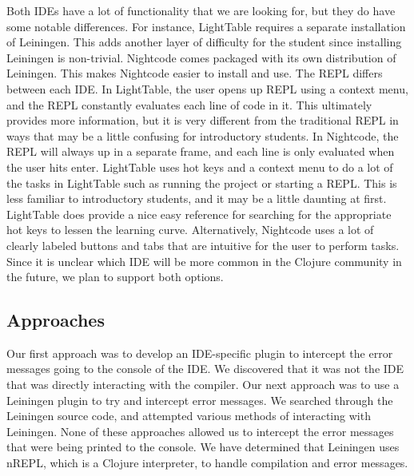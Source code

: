 \documentclass[12pt]{article}
\newcommand{\comment}[1]{{\bf \tt  {#1}}}
\newcommand{\emcomment}[1]{\textcolor{ForestGreen}{\comment{Elena: {#1}}}}
\newcommand{\mmcomment}[1]{\textcolor{magenta}{\comment{Max: {#1}}}}
\begin{document}
Both IDEs have a lot of functionality that we are looking for, but they do have some notable differences. For instance,  LightTable requires a separate installation of Leiningen. This adds another layer of difficulty for the student since installing Leiningen is non-trivial. Nightcode comes packaged with its own distribution of Leiningen. This makes Nightcode easier to install and use. The REPL differs between
 each IDE. In LightTable, the user opens up REPL using a context menu, and the REPL constantly evaluates each line of code in it. This ultimately provides more information, but it is very different from the traditional REPL in ways that may be a little confusing for introductory students. In Nightcode, the REPL will always up in a
  separate frame, and each line is only evaluated when the user hits enter. LightTable uses hot keys and a context menu to do a lot of the tasks in LightTable such as running the project or
 starting a REPL. This is less familiar to introductory students, and it may be a little daunting at first. LightTable does provide a nice easy reference for searching for the appropriate hot keys to lessen the learning curve. Alternatively, Nightcode
 uses a lot of clearly labeled buttons and tabs that are intuitive for the user to perform tasks. Since it is unclear which IDE will be more common in the Clojure community in the future, we plan to support both options.


\subsection{Approaches}\label{sec:approach}

Our first approach was to develop an IDE-specific plugin to intercept the error messages going to the console of the IDE. We discovered that it was not the IDE that was directly interacting with the compiler. Our next approach was to use a Leiningen plugin to try and intercept error messages. We searched through the Leiningen source code, and attempted various methods of interacting with Leiningen. None of these approaches allowed us to intercept the error messages that were being printed to the console. We have determined that Leiningen uses nREPL, which is a Clojure interpreter, to handle compilation and error messages.
\end{document}
